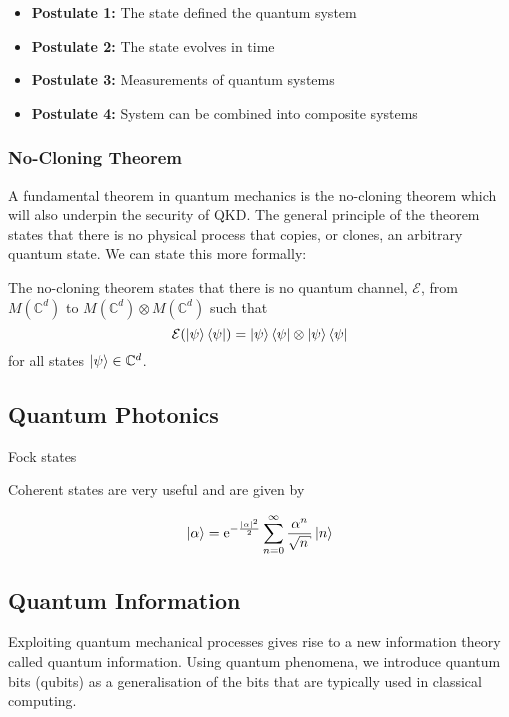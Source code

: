 \begin{itemize}
	\item[] \textbf{Postulate 1:} The state defined the quantum system
	\item[] \textbf{Postulate 2:} The state evolves in time
	\item[] \textbf{Postulate 3:} Measurements of quantum systems
	\item[] \textbf{Postulate 4:} System can be combined into composite systems
\end{itemize}

\subsubsection{No-Cloning Theorem}

A fundamental theorem in quantum mechanics is the {\color{bristol-red} no-cloning theorem} which will also underpin the security of \ac{QKD}. The general principle of the theorem states that there is no physical process that copies, or clones, an arbitrary quantum state. We can state this more formally:

\begin{theorem}
	 The no-cloning theorem states that there is no quantum channel, $\mathcal{E}$, from $M(\mathbb{C}^d)$ to $M(\mathbb{C}^d) \otimes M(\mathbb{C}^d)$ such that
	 \begin{equation*}
	 	\mathcal{E}(\ket{\psi}\bra{\psi}) = \ket{\psi}\bra{\psi} \otimes \ket{\psi}\bra{\psi}
	 \end{equation*}
	 for all states $\ket{\psi} \in \mathbb{C}^d$.
\end{theorem}

\subsection{Quantum Photonics}

Fock states

Coherent states are very useful and are given by

\begin{equation}
	\ket{\alpha} = \mathrm{e}^{-\frac{|\alpha|^2}{2}} \sum_{n=0}^\infty \frac{\alpha^n}{\sqrt{n}} \ket{n} 
\end{equation}

\subsection{Quantum Information}

Exploiting quantum mechanical processes gives rise to a new information theory called {\textcolor{bristol-red} quantum information}. Using quantum phenomena, we introduce quantum bits (qubits) as a generalisation of the bits that are typically used in classical computing.

